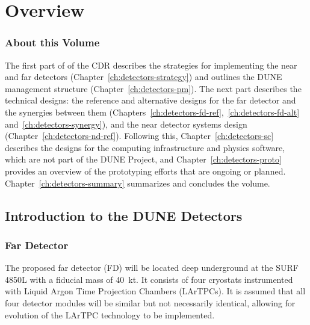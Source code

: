 \chapter{Overview}
\label{ch:detectors-overview}




\subsection{About this Volume}

The first part of \voldune of the CDR describes the strategies for
implementing the near and far detectors
(Chapter~\ref{ch:detectors-strategy}) and outlines the DUNE management
structure (Chapter~\ref{ch:detectors-pm}). The next part describes the
technical designs: the reference and alternative designs for the far
detector and the synergies between them
(Chapters~\ref{ch:detectors-fd-ref},~\ref{ch:detectors-fd-alt}
and~\ref{ch:detectors-synergy}), and the near detector systems design
(Chapter~\ref{ch:detectors-nd-ref}).  Following this,
Chapter~\ref{ch:detectors-sc} describes the designs for the computing
infrastructure and physics software,  
which are not part of the DUNE Project, and
Chapter~\ref{ch:detectors-proto} provides an overview of the
prototyping efforts that are ongoing or
planned. Chapter~\ref{ch:detectors-summary} summarizes and concludes
the volume.
 
\section{Introduction to the DUNE Detectors}
\label{sec:intro-dune-det}

\subsection{Far Detector}
\label{sec:intro-dune-far-det}

The proposed far detector (FD) will be located deep underground at the
SURF 4850L with a fiducial mass of 40~kt. It consists of four %
cryostats instrumented with Liquid Argon Time Projection
Chambers (LArTPCs). 
It is assumed that all four detector modules will be similar but not
necessarily identical, allowing for evolution of the LArTPC
technology to be implemented.  %

